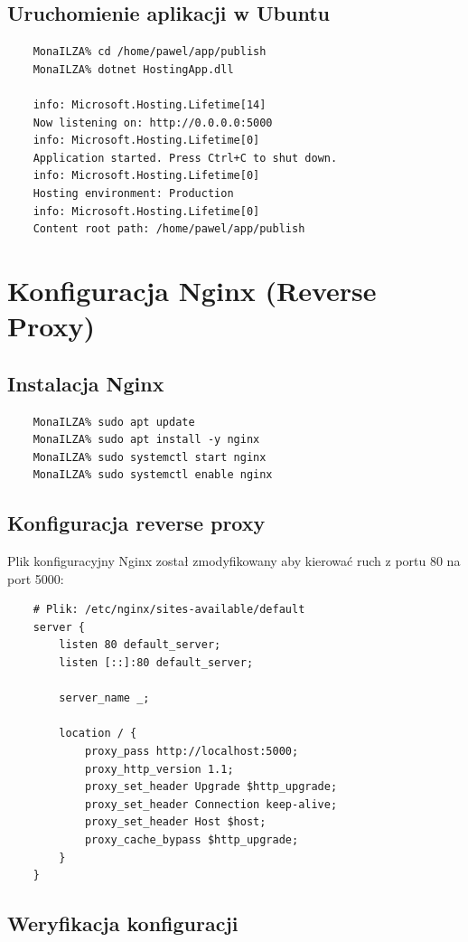 \documentclass[twoside]{article}
\begin{document}
\subsection{Uruchomienie aplikacji w Ubuntu}

\begin{verbatim}
	MonaILZA% cd /home/pawel/app/publish
	MonaILZA% dotnet HostingApp.dll
	
	info: Microsoft.Hosting.Lifetime[14]
	Now listening on: http://0.0.0.0:5000
	info: Microsoft.Hosting.Lifetime[0]
	Application started. Press Ctrl+C to shut down.
	info: Microsoft.Hosting.Lifetime[0]
	Hosting environment: Production
	info: Microsoft.Hosting.Lifetime[0]
	Content root path: /home/pawel/app/publish
\end{verbatim}

\section{Konfiguracja Nginx (Reverse Proxy)}

\subsection{Instalacja Nginx}

\begin{verbatim}
	MonaILZA% sudo apt update
	MonaILZA% sudo apt install -y nginx
	MonaILZA% sudo systemctl start nginx
	MonaILZA% sudo systemctl enable nginx
\end{verbatim}

\subsection{Konfiguracja reverse proxy}

Plik konfiguracyjny Nginx został zmodyfikowany aby kierować ruch z portu 80 na port 5000:

\begin{lstlisting}
	# Plik: /etc/nginx/sites-available/default
	server {
		listen 80 default_server;
		listen [::]:80 default_server;
		
		server_name _;
		
		location / {
			proxy_pass http://localhost:5000;
			proxy_http_version 1.1;
			proxy_set_header Upgrade $http_upgrade;
			proxy_set_header Connection keep-alive;
			proxy_set_header Host $host;
			proxy_cache_bypass $http_upgrade;
		}
	}
\end{lstlisting}

\subsection{Weryfikacja konfiguracji}
\end{document}
